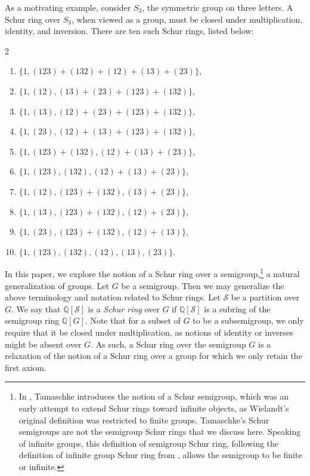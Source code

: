 \documentclass{article}
\theoremstyle{plain}
\theoremstyle{definition}
\renewcommand{\S}{\mathcal{S}}
\newcommand{\Q}{\mathbb{Q}}
\newcommand{\QG}{\Q[G]}
\newcommand{\QS}{\Q[\S]}
\begin{document}
 As a motivating example, consider \label{sym}$S_3$, the symmetric group on three letters. A Schur ring over $S_3$, when viewed as a group, must be closed under multiplication, identity, and inversion. There are ten such Schur rings, listed below:
\begin{multicols}{2}
\begin{enumerate}
    \item $\{1, (123)+(132) +(12)+ (13)+(23)\}$,
    \item $\{1, (12), (13)+(23)+(123)+(132)\}$,
    \item $\{1, (13), (12)+(23)+(123)+(132)\}$,
    \item $\{1, (23), (12)+(13)+(123)+(132)\}$,
    \item $\{1, (123)+(132), (12)+(13)+(23)\}$,
    \item $\{1, (123), (132), (12)+(13)+(23)\}$,
    \item $\{1, (12), (123)+(132), (13)+(23)\}$,
    \item $\{1, (13), (123)+(132), (12)+(23)\}$,
    \item $\{1, (23), (123)+(132), (12)+(13)\}$,
    \item $\{1, (123), (132), (12), (13), (23)\}$.
\end{enumerate}
\end{multicols}

In this paper, we explore the notion of a Schur ring over a semigroup,\footnote{In \cite{Tamaschke70}, Tamaschke introduces the notion of a Schur semigroup, which was an early attempt to extend Schur rings toward infinite objects, as Wielandt's original definition was restricted to finite groups. Tamaschke's Schur semigroups are not the semigroup Schur rings that we discuss here. Speaking of infinite groups, this definition of semigroup Schur ring, following the definition of infinite group Schur ring from \cite{InfiniteI}, allows the semigroup to be finite or infinite.} a natural generalization of groups. Let $G$ be a semigroup. Then we may generalize the above terminology and notation related to Schur rings. Let $\S$ be a partition over $G$. We say that $\QS$ is a \emph{Schur ring} over $G$ if $\QS$ is a subring of the semigroup ring $\QG$. Note that for a subset of $G$ to be a subsemigroup, we only require that it be closed under multiplication, as notions of identity or inverses might be absent over $G$. As such, a Schur ring over the semigroup $G$ is a relaxation of the notion of a Schur ring over a group for which we only retain the first axiom.
\end{document}
